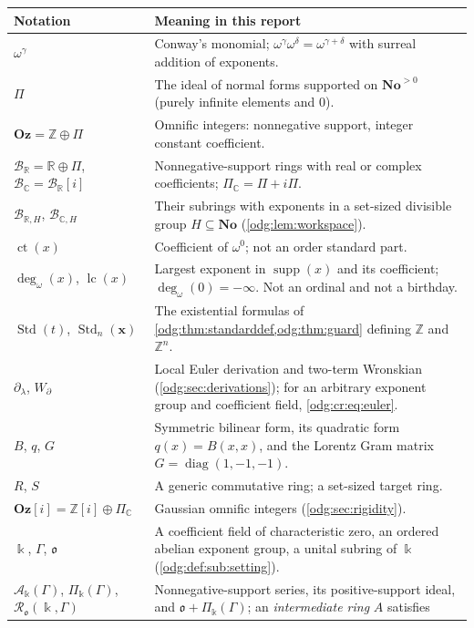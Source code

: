 \documentclass[11pt,oneside]{article}
\numberwithin{equation}{section}
\theoremstyle{definition}
\theoremstyle{remark}
\newcommand{\No}{\mathbf{No}}
\newcommand{\Oz}{\mathbf{Oz}}
\newcommand{\Z}{\mathbb Z}
\newcommand{\R}{\mathbb R}
\newcommand{\C}{\mathbb C}
\newcommand{\BR}{\mathcal B_{\R}}
\newcommand{\BC}{\mathcal B_{\C}}
\newcommand{\ct}{\operatorname{ct}}
\newcommand{\supp}{\operatorname{supp}}
\newcommand{\lc}{\operatorname{lc}}
\newcommand{\ddeg}{\operatorname{deg}_{\omega}}
\newcommand{\Std}{\operatorname{Std}}
\newcommand{\diag}{\operatorname{diag}}
\newcommand{\Og}{\Oz[i]}
\begin{document}
\begin{center}
\renewcommand{\arraystretch}{1.2}
\begin{tabular}{>{\raggedright\arraybackslash}p{}>{\raggedright\arraybackslash}p{}}
\toprule
Notation & Meaning in this report\\
\midrule
$\omega^\gamma$ & Conway's monomial; $\omega^\gamma\omega^\delta=\omega^{\gamma+\delta}$
with surreal addition of exponents.\\
$\Pi$ & The ideal of normal forms supported on $\No^{>0}$ (purely infinite
elements and $0$).\\
$\Oz=\Z\oplus\Pi$ & Omnific integers: nonnegative support, integer constant
coefficient.\\
$\BR=\R\oplus\Pi$, $\BC=\BR[i]$ & Nonnegative-support rings with real or complex
coefficients; $\Pi_{\C}=\Pi+i\Pi$.\\
$\mathcal B_{\R,H}$, $\mathcal B_{\C,H}$ & Their subrings with exponents in a
set-sized divisible group $H\subseteq\No$ (\cref{odg:lem:workspace}).\\
$\ct(x)$ & Coefficient of $\omega^0$; not an order standard part.\\
$\ddeg(x)$, $\lc(x)$ & Largest exponent in $\supp(x)$ and its coefficient;
$\ddeg(0)=-\infty$. Not an ordinal and not a birthday.\\
$\Std(t)$, $\Std_n(\mathbf x)$ & The existential formulas of
\cref{odg:thm:standarddef,odg:thm:guard} defining $\Z$ and $\Z^n$.\\
$\partial_\lambda$, $W_\partial$ & Local Euler derivation and two-term
Wronskian (\cref{odg:sec:derivations}); for an arbitrary exponent group and
coefficient field, \eqref{odg:cr:eq:euler}.\\
$B$, $q$, $G$ & Symmetric bilinear form, its quadratic form $q(x)=B(x,x)$,
and the Lorentz Gram matrix $G=\diag(1,-1,-1)$.\\
$R$, $S$ & A generic commutative ring; a set-sized target ring.\\
$\Og=\Z[i]\oplus\Pi_{\C}$ & Gaussian omnific integers (\cref{odg:sec:rigidity}).\\
$\Bbbk$, $\Gamma$, $\mathfrak o$ & A coefficient field of characteristic zero, an
ordered abelian exponent group, a unital subring of $\Bbbk$
(\cref{odg:def:sub:setting}).\\
$\mathcal A_\Bbbk(\Gamma)$, $\Pi_\Bbbk(\Gamma)$, $\mathcal R_{\mathfrak o}(\Bbbk,\Gamma)$ &
Nonnegative-support series, its positive-support ideal, and
$\mathfrak o+\Pi_\Bbbk(\Gamma)$; an \emph{intermediate ring} $A$ satisfies

\end{tabular}
\end{center}
\end{document}
